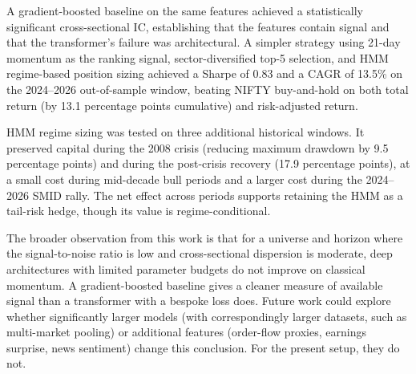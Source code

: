 \documentclass[conference]{IEEEtran}
\begin{document}
A gradient-boosted baseline on the same features achieved a statistically significant cross-sectional IC, establishing that the features contain signal and that the transformer's failure was architectural. A simpler strategy using 21-day momentum as the ranking signal, sector-diversified top-5 selection, and HMM regime-based position sizing achieved a Sharpe of 0.83 and a CAGR of 13.5\% on the 2024--2026 out-of-sample window, beating NIFTY buy-and-hold on both total return (by 13.1 percentage points cumulative) and risk-adjusted return.

HMM regime sizing was tested on three additional historical windows. It preserved capital during the 2008 crisis (reducing maximum drawdown by 9.5 percentage points) and during the post-crisis recovery (17.9 percentage points), at a small cost during mid-decade bull periods and a larger cost during the 2024--2026 SMID rally. The net effect across periods supports retaining the HMM as a tail-risk hedge, though its value is regime-conditional.

The broader observation from this work is that for a universe and horizon where the signal-to-noise ratio is low and cross-sectional dispersion is moderate, deep architectures with limited parameter budgets do not improve on classical momentum. A gradient-boosted baseline gives a cleaner measure of available signal than a transformer with a bespoke loss does. Future work could explore whether significantly larger models (with correspondingly larger datasets, such as multi-market pooling) or additional features (order-flow proxies, earnings surprise, news sentiment) change this conclusion. For the present setup, they do not.
\end{document}
